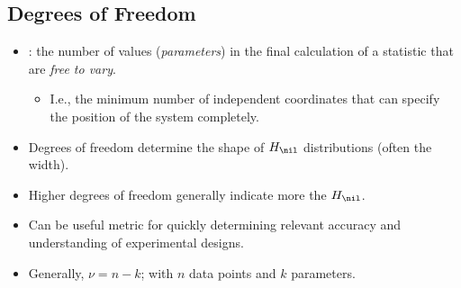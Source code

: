 \begin{itemize}
  \subsection{Degrees of Freedom}
  \begin{itemize}
    \item {}: the number of values (\emph{parameters}) in the final calculation of a statistic that are \emph{free to vary}.
      \begin{itemize}
        \item I.e., the minimum number of independent coordinates that can specify the position of the system completely.
      \end{itemize}
    \item Degrees of freedom determine the shape of \(H_\nil\) distributions (often the width).
    \item Higher degrees of freedom generally indicate more \hyperref[Section: Statistical Power and Sample Size]{} the \(H_\nil\).
    \item Can be useful metric for quickly determining relevant accuracy and understanding of experimental designs.
    \item Generally, \emph{\(\nu = n - k\)}; with \(n\) data points and \(k\) parameters.
  \end{itemize}


\end{itemize}
